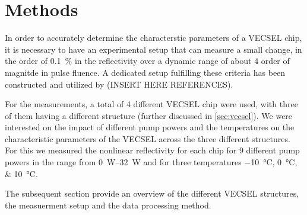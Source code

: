 \chapter{Methods}\label{chapter:methods}
In order to accurately determine the characterstic parameters of a VECSEL chip, it is necessary to have an experimental setup that can measure a small change, in the order of \qty{0.1}{\percent} in the reflectivity over a dynamic range of about 4 order of magnitde in pulse fluence. A dedicated setup fulfilling these criteria has been constructed and utilized by  (INSERT HERE REFERENCES).

For the measurements, a total of 4 different VECSEL chip were used, with three of them having a different structure (further discussed in \cref{sec:vecsel}). We were interested on the impact of different pump powers and the temperatures on the characteristic parameters of the VECSEL across the three different structures. For this we measured the nonlinear reflectivity for each chip for 9 different pump powers in the range from \qtyrange{0}{32}{\watt} and for three temperatures \qtylist{-10;0;10}{\degreeCelsius}.

The subsequent section provide an overview of the different VECSEL structures, the measuerment setup and the data processing method.








